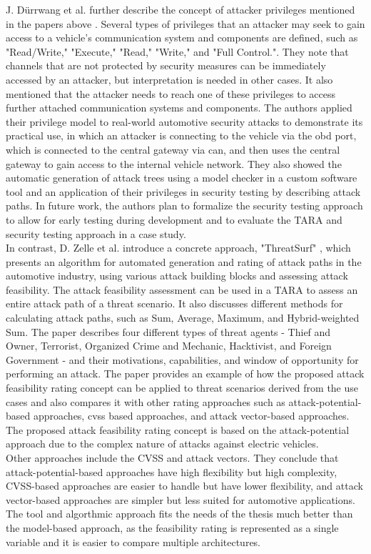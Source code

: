J. Dürrwang et al. further describe the concept of attacker privileges mentioned in the papers above \cite{attacker_privileges}.
Several types of privileges that an attacker may seek to gain access to a vehicle's communication system and components are defined, such as "Read/Write," "Execute," "Read," "Write," and "Full Control.".
They note that channels that are not protected by security measures can be immediately accessed by an attacker, but interpretation is needed in other cases. 
It also mentioned that the attacker needs to reach one of these privileges to access further attached communication systems and components.
The authors applied their privilege model to real-world automotive security attacks to demonstrate its practical use, in which
an attacker is connecting to the vehicle via the \gls{obd} port, which is connected to the central gateway via \gls{can}, and then uses the central gateway to gain access to the internal vehicle network.
They also showed the automatic generation of attack trees using a model checker in a custom software tool and an application of their privileges in security testing by describing attack paths. 
In future work, the authors plan to formalize the security testing approach to allow for early testing during development and to evaluate the TARA and security testing approach in a case study.\\

In contrast, D. Zelle et al. introduce a concrete approach, "ThreatSurf" \cite{threat_surf}, which presents an algorithm for automated generation and rating of 
attack paths in the automotive industry, using various attack building blocks and assessing attack feasibility.
The attack feasibility assessment can be used in a TARA to assess an entire attack path of a threat scenario.
It also discusses different methods for calculating attack paths, such as Sum, Average, Maximum, and Hybrid-weighted Sum. 
The paper describes four different types of threat agents - Thief and Owner, Terrorist, Organized Crime and Mechanic, Hacktivist, and Foreign Government - 
and their motivations, capabilities, and window of opportunity for performing an attack. 
The paper provides an example of how the proposed attack feasibility rating concept can be applied to threat scenarios derived from the use cases and also 
compares it with other rating approaches such as attack-potential-based approaches, \gls{cvss} based approaches, and attack vector-based approaches.
The proposed attack feasibility rating concept is based on the attack-potential approach due to the complex nature of attacks against electric vehicles.\\
Other approaches include the CVSS and attack vectors.
They conclude that attack-potential-based approaches have high flexibility but high complexity, 
CVSS-based approaches are easier to handle but have lower flexibility, and attack vector-based approaches are simpler but less suited for automotive applications.\\
The tool and algorthmic approach fits the needs of the thesis much better than the model-based approach, as the feasibility rating is represented as a single variable and it is easier to compare multiple architectures.\\

